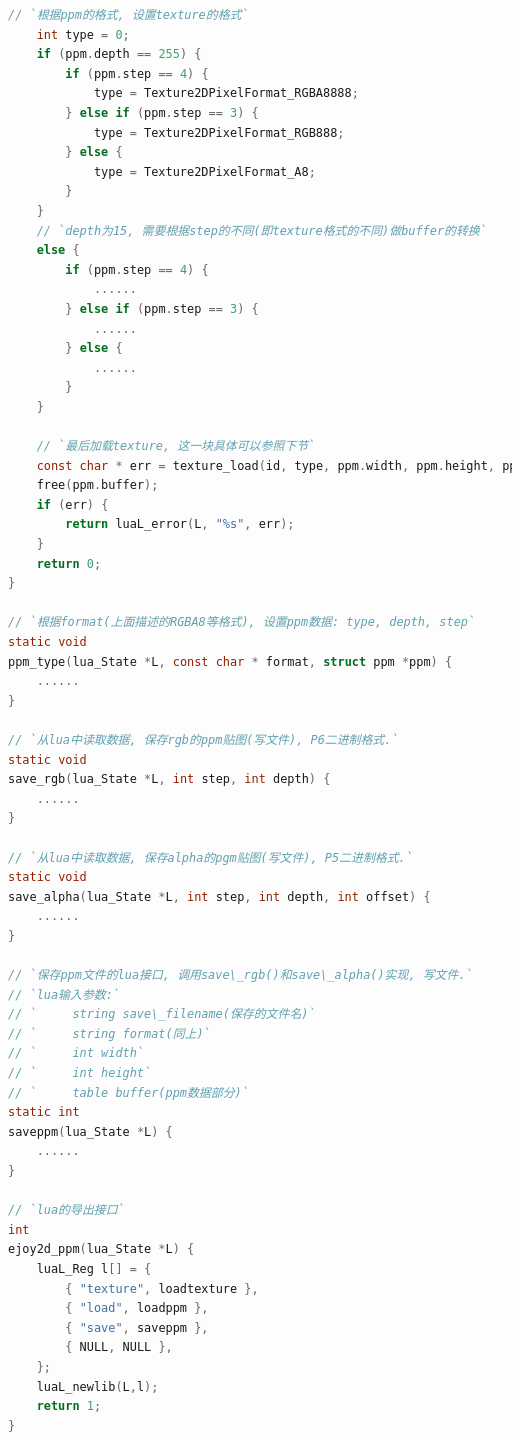 {\begin{lstlisting}[language=C]
    // `根据ppm的格式, 设置texture的格式`
    int type = 0;
    if (ppm.depth == 255) {
        if (ppm.step == 4) {
            type = Texture2DPixelFormat_RGBA8888;
        } else if (ppm.step == 3) {
            type = Texture2DPixelFormat_RGB888;
        } else {
            type = Texture2DPixelFormat_A8;
        }
    }
    // `depth为15, 需要根据step的不同(即texture格式的不同)做buffer的转换`
    else {
        if (ppm.step == 4) {
            ......
        } else if (ppm.step == 3) {
            ......
        } else {
            ......
        }
    }

    // `最后加载texture, 这一块具体可以参照下节`
    const char * err = texture_load(id, type, ppm.width, ppm.height, ppm.buffer);
    free(ppm.buffer);
    if (err) {
        return luaL_error(L, "%s", err);
    }
    return 0;
}

// `根据format(上面描述的RGBA8等格式), 设置ppm数据: type, depth, step`
static void
ppm_type(lua_State *L, const char * format, struct ppm *ppm) {
    ......
}

// `从lua中读取数据, 保存rgb的ppm贴图(写文件), P6二进制格式.`
static void
save_rgb(lua_State *L, int step, int depth) {
    ......
}

// `从lua中读取数据, 保存alpha的pgm贴图(写文件), P5二进制格式.`
static void
save_alpha(lua_State *L, int step, int depth, int offset) {
    ......
}

// `保存ppm文件的lua接口, 调用save\_rgb()和save\_alpha()实现, 写文件.`
// `lua输入参数:`
// `     string save\_filename(保存的文件名)`
// `     string format(同上)`
// `     int width`
// `     int height`
// `     table buffer(ppm数据部分)`
static int
saveppm(lua_State *L) {
    ......
}

// `lua的导出接口`
int
ejoy2d_ppm(lua_State *L) {
    luaL_Reg l[] = {
        { "texture", loadtexture },
        { "load", loadppm },
        { "save", saveppm },
        { NULL, NULL },
    };
    luaL_newlib(L,l);
    return 1;
}

    \end{lstlisting}
}

